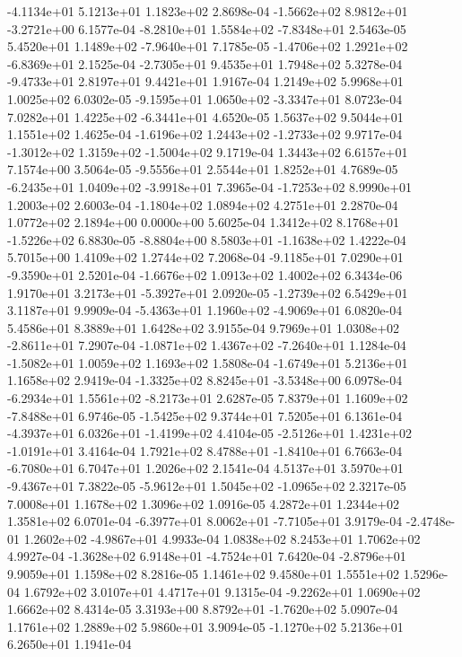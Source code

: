 -4.1134e+01  5.1213e+01  1.1823e+02  2.8698e-04
-1.5662e+02  8.9812e+01 -3.2721e+00  6.1577e-04
-8.2810e+01  1.5584e+02 -7.8348e+01  2.5463e-05
 5.4520e+01  1.1489e+02 -7.9640e+01  7.1785e-05
-1.4706e+02  1.2921e+02 -6.8369e+01  2.1525e-04
-2.7305e+01  9.4535e+01  1.7948e+02  5.3278e-04
-9.4733e+01  2.8197e+01  9.4421e+01  1.9167e-04
1.2149e+02 5.9968e+01 1.0025e+02  6.0302e-05
-9.1595e+01  1.0650e+02 -3.3347e+01  8.0723e-04
 7.0282e+01  1.4225e+02 -6.3441e+01  4.6520e-05
1.5637e+02 9.5044e+01 1.1551e+02  1.4625e-04
-1.6196e+02  1.2443e+02 -1.2733e+02  9.9717e-04
-1.3012e+02  1.3159e+02 -1.5004e+02  9.1719e-04
1.3443e+02 6.6157e+01 7.1574e+00  3.5064e-05
-9.5556e+01  2.5544e+01  1.8252e+01  4.7689e-05
-6.2435e+01  1.0409e+02 -3.9918e+01  7.3965e-04
-1.7253e+02  8.9990e+01  1.2003e+02  2.6003e-04
-1.1804e+02  1.0894e+02  4.2751e+01  2.2870e-04
1.0772e+02 2.1894e+00 0.0000e+00  5.6025e-04
 1.3412e+02  8.1768e+01 -1.5226e+02  6.8830e-05
-8.8804e+00  8.5803e+01 -1.1638e+02  1.4222e-04
5.7015e+00 1.4109e+02 1.2744e+02  7.2068e-04
-9.1185e+01  7.0290e+01 -9.3590e+01  2.5201e-04
-1.6676e+02  1.0913e+02  1.4002e+02  6.3434e-06
 1.9170e+01  3.2173e+01 -5.3927e+01  2.0920e-05
-1.2739e+02  6.5429e+01  3.1187e+01  9.9909e-04
-5.4363e+01  1.1960e+02 -4.9069e+01  6.0820e-04
5.4586e+01 8.3889e+01 1.6428e+02  3.9155e-04
 9.7969e+01  1.0308e+02 -2.8611e+01  7.2907e-04
-1.0871e+02  1.4367e+02 -7.2640e+01  1.1284e-04
-1.5082e+01  1.0059e+02  1.1693e+02  1.5808e-04
-1.6749e+01  5.2136e+01  1.1658e+02  2.9419e-04
-1.3325e+02  8.8245e+01 -3.5348e+00  6.0978e-04
-6.2934e+01  1.5561e+02 -8.2173e+01  2.6287e-05
 7.8379e+01  1.1609e+02 -7.8488e+01  6.9746e-05
-1.5425e+02  9.3744e+01  7.5205e+01  6.1361e-04
-4.3937e+01  6.0326e+01 -1.4199e+02  4.4104e-05
-2.5126e+01  1.4231e+02 -1.0191e+01  3.4164e-04
 1.7921e+02  8.4788e+01 -1.8410e+01  6.7663e-04
-6.7080e+01  6.7047e+01  1.2026e+02  2.1541e-04
 4.5137e+01  3.5970e+01 -9.4367e+01  7.3822e-05
-5.9612e+01  1.5045e+02 -1.0965e+02  2.3217e-05
7.0008e+01 1.1678e+02 1.3096e+02  1.0916e-05
4.2872e+01 1.2344e+02 1.3581e+02  6.0701e-04
-6.3977e+01  8.0062e+01 -7.7105e+01  3.9179e-04
-2.4748e-01  1.2602e+02 -4.9867e+01  4.9933e-04
1.0838e+02 8.2453e+01 1.7062e+02  4.9927e-04
-1.3628e+02  6.9148e+01 -4.7524e+01  7.6420e-04
-2.8796e+01  9.9059e+01  1.1598e+02  8.2816e-05
1.1461e+02 9.4580e+01 1.5551e+02  1.5296e-04
1.6792e+02 3.0107e+01 4.4717e+01  9.1315e-04
-9.2262e+01  1.0690e+02  1.6662e+02  8.4314e-05
 3.3193e+00  8.8792e+01 -1.7620e+02  5.0907e-04
1.1761e+02 1.2889e+02 5.9860e+01  3.9094e-05
-1.1270e+02  5.2136e+01  6.2650e+01  1.1941e-04
